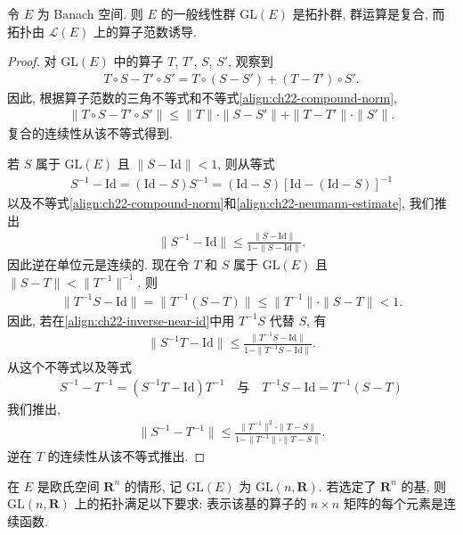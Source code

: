 \documentclass[../../main.tex]{subfiles}
\begin{document}
\begin{theorem}[一般线性群是拓扑群]\label{theorem:ch22-gl-topological}
令 $E$ 为 Banach 空间. 则 $E$ 的一般线性群 $\mathrm{GL}(E)$ 是拓扑群, 群运算是复合, 而拓扑由 $\mathcal{L}(E)$ 上的算子范数诱导.
\end{theorem}

\begin{proof}
对 $\mathrm{GL}(E)$ 中的算子 $T$, $T'$, $S$, $S'$, 观察到
\begin{align*}
T\circ S-T'\circ S'=T\circ(S-S')+(T-T')\circ S'.
\end{align*}
因此, 根据算子范数的三角不等式和不等式\eqref{align:ch22-compound-norm},
\begin{align*}
\|T\circ S-T'\circ S'\|\leqslant\|T\|\cdot\|S-S'\|+\|T-T'\|\cdot\|S'\|.
\end{align*}
复合的连续性从该不等式得到.

若 $S$ 属于 $\mathrm{GL}(E)$ 且 $\|S-\mathrm{Id}\|<1$, 则从等式
\begin{align*}
S^{-1}-\mathrm{Id}=(\mathrm{Id}-S)S^{-1}=(\mathrm{Id}-S)[\mathrm{Id}-(\mathrm{Id}-S)]^{-1}
\end{align*}
以及不等式\eqref{align:ch22-compound-norm}和\eqref{align:ch22-neumann-estimate}, 我们推出
\begin{align}
\|S^{-1}-\mathrm{Id}\|\leqslant\frac{\|S-\mathrm{Id}\|}{1-\|S-\mathrm{Id}\|}.
\label{align:ch22-inverse-near-id}
\end{align}
因此逆在单位元是连续的. 现在令 $T$ 和 $S$ 属于 $\mathrm{GL}(E)$ 且 $\|S-T\|<\|T^{-1}\|^{-1}$. 则
\begin{align*}
\|T^{-1}S-\mathrm{Id}\|=\|T^{-1}(S-T)\|\leqslant\|T^{-1}\|\cdot\|S-T\|<1.
\end{align*}
因此, 若在\eqref{align:ch22-inverse-near-id}中用 $T^{-1}S$ 代替 $S$, 有
\begin{align*}
\|S^{-1}T-\mathrm{Id}\|\leqslant\frac{\|T^{-1}S-\mathrm{Id}\|}{1-\|T^{-1}S-\mathrm{Id}\|}.
\end{align*}
从这个不等式以及等式
\begin{align*}
S^{-1}-T^{-1}=(S^{-1}T-\mathrm{Id})T^{-1}\quad\text{与}\quad T^{-1}S-\mathrm{Id}=T^{-1}(S-T)
\end{align*}
我们推出,
\begin{align*}
\|S^{-1}-T^{-1}\|\leqslant\frac{\|T^{-1}\|^{2}\cdot\|T-S\|}{1-\|T^{-1}\|\cdot\|T-S\|}.
\end{align*}
逆在 $T$ 的连续性从该不等式推出.
\end{proof}

在 $E$ 是欧氏空间 $\mathbf{R}^{n}$ 的情形, 记 $\mathrm{GL}(E)$ 为 $\mathrm{GL}(n,\mathbf{R})$. 若选定了 $\mathbf{R}^{n}$ 的基, 则 $\mathrm{GL}(n,\mathbf{R})$ 上的拓扑满足以下要求: 表示该基的算子的 $n\times n$ 矩阵的每个元素是连续函数.
\end{document}
